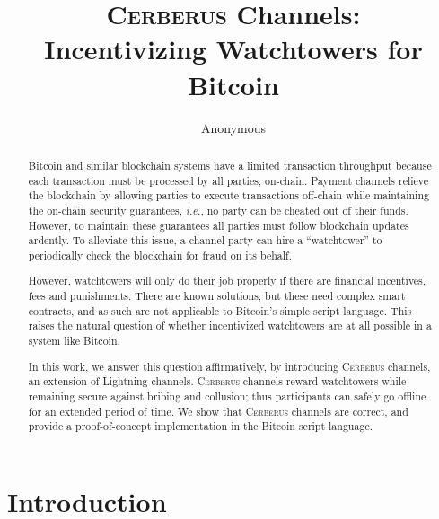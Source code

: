 \documentclass[runningheads]{llncs}
\newcommand{\ie}{{\em i.e.}}
\newcommand{\sys}{\textsc{Cerberus}\xspace}
\begin{document}
\title{\sys Channels: \\ Incentivizing Watchtowers for Bitcoin}
\author{Anonymous
}

\date{}
\maketitle


%
%
\begin{abstract}
Bitcoin and similar blockchain systems have a limited transaction throughput because each transaction must be processed by all parties, on-chain. 
Payment channels relieve the blockchain by allowing parties to execute transactions off-chain while maintaining the on-chain security guarantees, \ie, no party can be cheated out of their funds. However, to maintain these guarantees all parties must follow blockchain updates ardently.
To alleviate this issue, a channel party can hire a ``watchtower'' to periodically check the blockchain for fraud on its behalf.

However, watchtowers will only do their job properly if there are financial incentives, fees and punishments. There are known solutions, but these need complex smart contracts, and as such are not applicable to Bitcoin's simple script language. This raises the natural question of whether incentivized watchtowers are at all possible in a system like Bitcoin.

In this work, we answer this question affirmatively, by introducing \sys channels, an extension of Lightning channels. \sys channels reward watchtowers while remaining secure against bribing and collusion; thus participants can safely go offline for an extended period of time. 
We show that \sys channels are correct, and provide a proof-of-concept implementation in the Bitcoin script language.

\end{abstract}


\section{Introduction}
\label{sec:intro}
\end{document}
